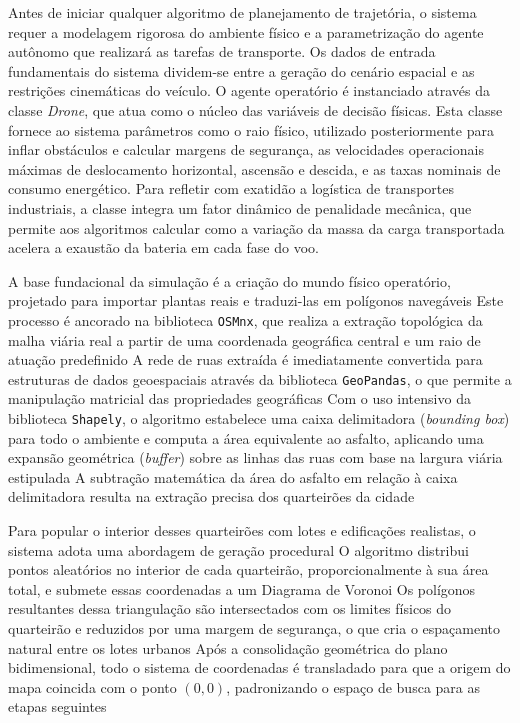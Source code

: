 Antes de iniciar qualquer algoritmo de planejamento de trajetória, o sistema requer a modelagem rigorosa do ambiente físico e a parametrização do agente autônomo que realizará as tarefas de transporte. Os dados de entrada fundamentais do sistema dividem-se entre a geração do cenário espacial e as restrições cinemáticas do veículo. O agente operatório é instanciado através da classe \textit{Drone}, que atua como o núcleo das variáveis de decisão físicas. Esta classe fornece ao sistema parâmetros como o raio físico, utilizado posteriormente para inflar obstáculos e calcular margens de segurança, as velocidades operacionais máximas de deslocamento horizontal, ascensão e descida, e as taxas nominais de consumo energético. Para refletir com exatidão a logística de transportes industriais, a classe integra um fator dinâmico de penalidade mecânica, que permite aos algoritmos calcular como a variação da massa da carga transportada acelera a exaustão da bateria em cada fase do voo.

A base fundacional da simulação é a criação do mundo físico operatório, projetado para importar plantas reais e traduzi-las em polígonos navegáveis %
Este processo é ancorado na biblioteca \texttt{OSMnx}, que realiza a extração topológica da malha viária real a partir de uma coordenada geográfica central e um raio de atuação predefinido %
A rede de ruas extraída é imediatamente convertida para estruturas de dados geoespaciais através da biblioteca \texttt{GeoPandas}, o que permite a manipulação matricial das propriedades geográficas %
Com o uso intensivo da biblioteca \texttt{Shapely}, o algoritmo estabelece uma caixa delimitadora (\textit{bounding box}) para todo o ambiente e computa a área equivalente ao asfalto, aplicando uma expansão geométrica (\textit{buffer}) sobre as linhas das ruas com base na largura viária estipulada %
A subtração matemática da área do asfalto em relação à caixa delimitadora resulta na extração precisa dos quarteirões da cidade %

Para popular o interior desses quarteirões com lotes e edificações realistas, o sistema adota uma abordagem de geração procedural %
O algoritmo distribui pontos aleatórios no interior de cada quarteirão, proporcionalmente à sua área total, e submete essas coordenadas a um Diagrama de Voronoi %
Os polígonos resultantes dessa triangulação são intersectados com os limites físicos do quarteirão e reduzidos por uma margem de segurança, o que cria o espaçamento natural entre os lotes urbanos %
Após a consolidação geométrica do plano bidimensional, todo o sistema de coordenadas é transladado para que a origem do mapa coincida com o ponto $(0,0)$, padronizando o espaço de busca para as etapas seguintes %

